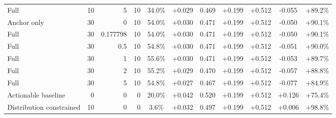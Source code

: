 \begin{table}[htbp]
\begin{tabular}{lrrrccccccc}
Full & 10 & 5 & 10 & 34.0\% & +0.029 & 0.469 & +0.199 & +0.512 & -0.055 & +89.2\% \\
Anchor only & 30 & 0 & 10 & 54.0\% & +0.030 & 0.471 & +0.199 & +0.512 & -0.050 & +90.1\% \\
Full & 30 & 0.177798 & 10 & 54.0\% & +0.030 & 0.471 & +0.199 & +0.512 & -0.050 & +90.1\% \\
Full & 30 & 0.5 & 10 & 54.8\% & +0.030 & 0.471 & +0.199 & +0.512 & -0.051 & +90.0\% \\
Full & 30 & 1 & 10 & 55.6\% & +0.030 & 0.471 & +0.199 & +0.512 & -0.053 & +89.7\% \\
Full & 30 & 2 & 10 & 55.2\% & +0.029 & 0.470 & +0.199 & +0.512 & -0.057 & +88.8\% \\
Full & 30 & 5 & 10 & 54.8\% & +0.027 & 0.467 & +0.199 & +0.512 & -0.077 & +84.9\% \\
Actionable baseline & 0 & 0 & 0 & 20.0\% & +0.042 & 0.520 & +0.199 & +0.512 & +0.126 & +75.4\% \\
Distribution constrained & 10 & 0 & 0 & 3.6\% & +0.032 & 0.497 & +0.199 & +0.512 & +0.006 & +98.8\% \\
\bottomrule
\end{tabular}
\end{table}
